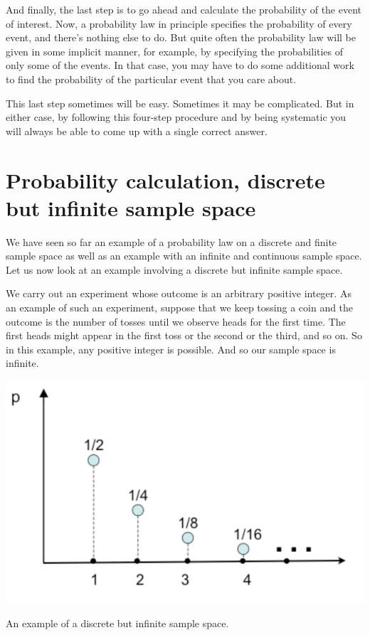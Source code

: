 \documentclass{tufte-handout}
\begin{document}
And finally, the last step is to go ahead and calculate the probability of the event of interest. Now, a
probability law in principle specifies the probability of every event, and there's nothing else to do. But
quite often the probability law will be given in some implicit manner, for example, by specifying the
probabilities of only some of the events. In that case, you may have to do some additional work to find
the probability of the particular event that you care about.

This last step sometimes will be easy. Sometimes it may be complicated. But in either case, by following
this four-step procedure and by being systematic you will always be able to come up with a single
correct answer.

\pagebreak
\section{Probability calculation, discrete but infinite sample space}\label{sec:continuous-example}

We have seen so far an example of a probability law on a discrete and finite sample space as well as
an example with an infinite and continuous sample space. Let us now look at an example involving a
discrete but infinite sample space.

We carry out an experiment whose outcome is an arbitrary positive integer. As an example of such an
experiment, suppose that we keep tossing a coin and the outcome is the number of tosses until we
observe heads for the first time. The first heads might appear in the first toss or the second or the third,
and so on. So in this example, any positive integer is possible. And so our sample space is infinite.


\begin{marginfigure}
  \includegraphics{InfiniteSampleSpace}
  \caption{An example of a discrete but infinite sample space.}
\end{marginfigure}
\end{document}
